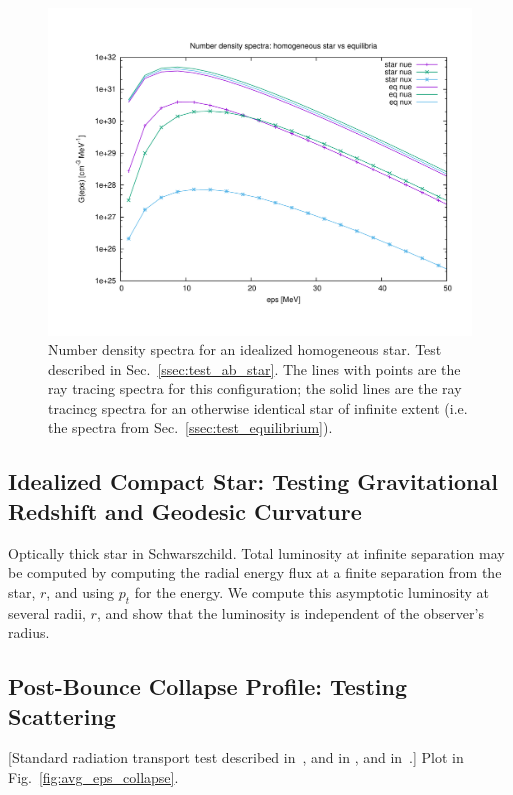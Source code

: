 \documentclass[aps,floatfix,prd,superscriptaddress,twocolumn]{revtex4-1}
\newcommand{\todo}[1]{\marginpar{\tiny{\textcolor{red}{#1}}}}
\begin{document}
\begin{figure}
  \includegraphics[width=\columnwidth]{fig-G_spectra-absorption_star}
  \caption{Number density spectra for an idealized homogeneous star.
    Test described in Sec.~\ref{ssec:test_ab_star}.
    The lines with points are the ray tracing spectra for this configuration;
    the solid lines are the ray tracincg spectra for an otherwise identical star
    of infinite extent (i.e. the spectra from Sec.~\ref{ssec:test_equilibrium}).
  }
  \label{fig:G_absorption_sphere}
\end{figure}

\subsection{Idealized Compact Star:
  Testing Gravitational Redshift and Geodesic Curvature}
\label{ssec:test_gravity}
Optically thick star in Schwarszchild.
Total luminosity at infinite separation may be computed by
computing the radial energy flux at a finite separation from the star, $r$,
and using $p_t$ for the energy. We compute this asymptotic luminosity
at several radii, $r$, and show that the luminosity is independent of
the observer's radius.
\todo{compute $L$, put in figure}

\subsection{Post-Bounce Collapse Profile:
  Testing Scattering}
\label{ssec:test_collapse}
[Standard radiation transport test described in~\cite{ocon2015-gr1d_with_nu},
and in \cite[App.~E.6]{fouc2015-m1_nsbh},
and in~\cite{abdi2012-monte_carlo}.]
Plot in Fig.~\ref{fig:avg_eps_collapse}.
\end{document}
